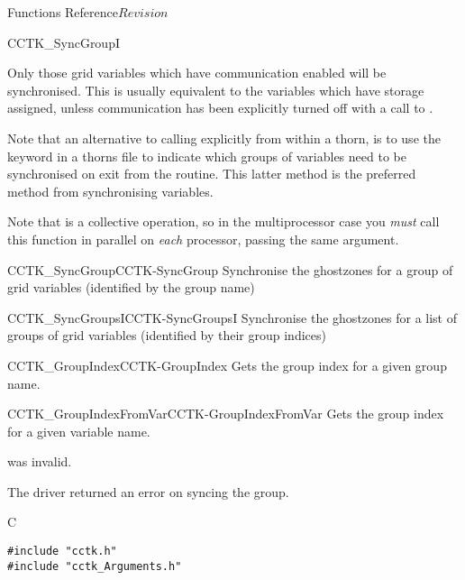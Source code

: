 \begin{cactuspart}{ Functions Reference}{}{$Revision$}
\begin{FunctionDescription}{CCTK\_SyncGroupI}
\begin{Discussion}
Only those grid variables which have communication enabled
will be synchronised. This is usually equivalent to the variables
which have storage assigned, unless communication has been explicitly
turned off with a call to .

Note that an alternative to calling  explicitly
from within a thorn, is to use the  keyword in a thorns
 file to indicate which groups of variables need
to be synchronised on exit from the routine. This latter method is
the preferred method from synchronising variables.

Note that  is a collective operation, so in the
multiprocessor case you {\em must\/} call this function in parallel on
{\em each\/} processor, passing the same  argument.
\end{Discussion}

\begin{SeeAlsoSection}
\begin{SeeAlso2}{CCTK\_SyncGroup}{CCTK-SyncGroup}
Synchronise the ghostzones for a group of grid variables
(identified by the group name)
\end{SeeAlso2}
\begin{SeeAlso2}{CCTK\_SyncGroupsI}{CCTK-SyncGroupsI}
Synchronise the ghostzones for a list of groups of grid variables
(identified by their group indices)
\end{SeeAlso2}
\begin{SeeAlso2}{CCTK\_GroupIndex}{CCTK-GroupIndex}
Gets the group index for a given group name.
\end{SeeAlso2}
\begin{SeeAlso2}{CCTK\_GroupIndexFromVar}{CCTK-GroupIndexFromVar}
Gets the group index for a given variable name.
\end{SeeAlso2}
\end{SeeAlsoSection}

\begin{ErrorSection}
\begin{Error}{-1}
 was invalid.
\end{Error}
\begin{Error}{-2}
The driver returned an error on syncing the group.
\end{Error}
\end{ErrorSection}

\begin{ExampleSection}
\begin{Example}{C}
\begin{verbatim}
#include "cctk.h"
#include "cctk_Arguments.h"


\end{verbatim}
\end{Example}
\end{ExampleSection}
\end{FunctionDescription}
\end{cactuspart}
